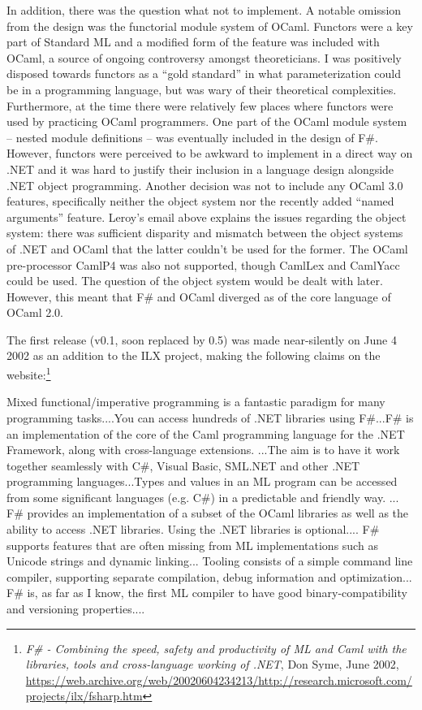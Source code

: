 \documentclass[acmsmall,review]{acmart}\settopmatter{printfolios=true,printccs=false,printacmref=false}
\begin{document}
In addition, there was the question what not to implement.  A notable omission from the design was the functorial module system of OCaml.  Functors were a key part of Standard ML and a modified form of the feature was included with OCaml, a source of ongoing controversy amongst theoreticians.  I was positively disposed towards functors as a “gold standard” in what parameterization could be in a programming language, but was wary of their theoretical complexities. Furthermore, at the time there were relatively few places where functors were used by practicing OCaml programmers. One part of the OCaml module system – nested module definitions – was eventually included in the design of F\#.  However, functors were perceived to be awkward to implement in a direct way on .NET and it was hard to justify their inclusion in a language design alongside .NET object programming. Another decision was not to include any OCaml 3.0 features, specifically neither the object system nor the recently added “named arguments” feature.  Leroy’s email above explains the issues regarding the object system: there was sufficient disparity and mismatch between the object systems of .NET and OCaml that the latter couldn’t be used for the former.  The OCaml pre-processor CamlP4 was also not supported, though CamlLex and CamlYacc could be used. The question of the object system would be dealt with later.  However, this meant that F\# and OCaml diverged as of the core language of OCaml 2.0.


The first release (v0.1, soon replaced by 0.5) was made near-silently on June 4 2002 as an addition to the ILX project, making the following claims on the website:\footnote{\textit{F\# - Combining the speed, safety and productivity of ML and Caml with the libraries, tools and cross-language working of .NET}, Don Syme, June 2002, \url{https://web.archive.org/web/20020604234213/http://research.microsoft.com/projects/ilx/fsharp.htm}}
\begin{verbquote}
Mixed functional/imperative programming is a fantastic paradigm for many programming tasks....You can access hundreds of .NET libraries using F\#...F\# is an implementation of the core of the Caml programming language for the .NET Framework, along with cross-language extensions. ...The aim is to have it work together seamlessly with C\#, Visual Basic, SML.NET and other .NET programming languages...Types and values in an ML program can be accessed from some significant languages (e.g. C\#) in a predictable and friendly way. ... F\# provides an implementation of a subset of the OCaml libraries as well as the ability to access .NET libraries.  Using the .NET libraries is optional.... F\# supports features that are often missing from ML implementations such as Unicode strings and dynamic linking... Tooling consists of a simple command line compiler, supporting separate compilation, debug information and optimization... F\# is, as far as I know, the first ML compiler to have good binary-compatibility and versioning properties....
\end{verbquote}
\end{document}
